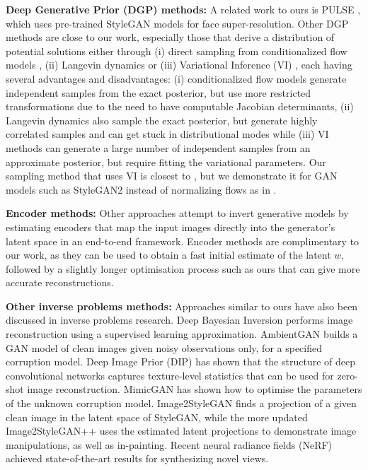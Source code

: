 \documentclass{article}
\newcommand{\pulse}{PULSE \cite{menon2020pulse}}
\begin{document}
\textbf{Deep Generative Prior (DGP) methods:} A related work to ours is \pulse, which uses pre-trained StyleGAN models for face super-resolution. Other DGP methods \cite{bora2017compressed,pan2020exploiting,asim2020invertible,hand2018phase,kelkar2021prior} 
 are close to our work, especially those that derive a distribution of potential solutions either through (i) direct sampling from conditionalized flow models \cite{lugmayr2020srflow}, (ii) Langevin dynamics \cite{jalal2021robust,jalal2021instance} or (iii) Variational Inference (VI) \cite{whang2021composing}, each having several advantages and disadvantages: (i) conditionalized flow models generate independent samples from the exact posterior, but use more restricted transformations due to the need to have computable Jacobian determinants, (ii) Langevin dynamics also sample the exact posterior, but generate highly correlated samples and can get stuck in distributional modes while (iii) VI methods can generate a large number of independent samples from an approximate posterior, but require fitting the variational parameters. Our sampling method that uses VI is closest to \cite{whang2021composing}, but we demonstrate it for GAN models such as StyleGAN2 instead of normalizing flows as in \cite{whang2021composing}.

\textbf{Encoder methods:} Other approaches attempt to invert generative models by estimating encoders that map the input images directly into the generator's latent space \cite{richardson2020encoding} in an end-to-end framework. Encoder methods are complimentary to our work, as they can be used to obtain a fast initial estimate of the latent $w$, followed by a slightly longer optimisation process such as ours that can give more accurate reconstructions.


\textbf{Other inverse problems methods:} Approaches similar to ours have also been discussed in inverse problems research. Deep Bayesian Inversion \cite{adler2018deep} performs image reconstruction using a supervised learning approximation. AmbientGAN \cite{bora2018ambientgan} builds a GAN model of clean images given noisy observations only, for a specified corruption model. Deep Image Prior (DIP) \cite{ulyanov2018deep} has shown that the structure of deep convolutional networks captures texture-level statistics that can be used for zero-shot image reconstruction. MimicGAN \cite{anirudh2020mimicgan} has shown how to optimise the parameters of the unknown corruption model. Image2StyleGAN \cite{abdal2019image2stylegan} finds a projection of a given clean image in the latent space of StyleGAN, while the more updated Image2StyleGAN++ \cite{abdal2020image2stylegan} uses the estimated latent projections to demonstrate image manipulations, as well as in-painting. Recent neural radiance fields (NeRF) \cite{mildenhall2020nerf} achieved state-of-the-art results for synthesizing novel views. 
\end{document}
